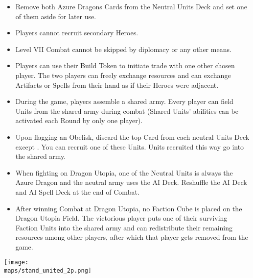 \begin{multicols}{2}
\begin{itemize}
  \item Remove both Azure Dragons Cards from the  Neutral Units Deck and set one of them aside for later use.
  \item Players cannot recruit secondary Heroes.
  \item Level VII Combat cannot be skipped by diplomacy or any other means.
  \item Players can use their Build Token to initiate trade with one other chosen player. The two players can freely exchange resources and can exchange Artifacts or Spells from their hand as if their Heroes were adjacent.
  \item During the game, players assemble a shared army. Every player can field Units from the shared army during combat (Shared Units'  abilities can be activated each Round by only one player).
  \item Upon flagging an Obelisk, discard the top Card from each neutral Units Deck except . You can recruit one of these Units. Units recruited this way go into the shared army.
  \item When fighting on Dragon Utopia, one of the Neutral  Units is always the Azure Dragon and the neutral army uses the AI Deck. Reshuffle the AI Deck and AI Spell Deck at the end of Combat.
  \item After winning Combat at Dragon Utopia, no Faction Cube is placed on the Dragon Utopia Field. The victorious player puts one of their surviving Faction Units into the shared army and can redistribute their remaining resources among other players, after which that player gets removed from the game.
\end{itemize}

\columnbreak

\begin{center}
  \texttt{[image: \\maps/stand\_united\_2p.png]}
\end{center}

\vspace*{\fill}

\end{multicols}


